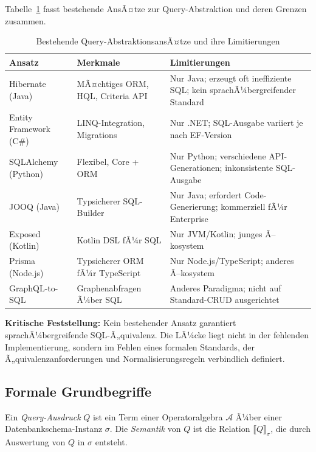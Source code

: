 Tabelle~\ref{tab:bestehend} fasst bestehende AnsÃ¤tze zur Query-Abstraktion
und deren Grenzen zusammen.

\begin{table}[H]
\centering
\caption{Bestehende Query-AbstraktionsansÃ¤tze und ihre Limitierungen}
\label{tab:bestehend}
\renewcommand{\arraystretch}{1.3}
\begin{tabularx}{\textwidth}{lXX}
\toprule
\textbf{Ansatz} & \textbf{Merkmale} & \textbf{Limitierungen} \\
\midrule
Hibernate (Java)
  & MÃ¤chtiges ORM, HQL, Criteria API
  & Nur Java; erzeugt oft ineffiziente SQL; kein sprachÃ¼bergreifender Standard \\
\hline
Entity Framework (C\#)
  & LINQ-Integration, Migrations
  & Nur .NET; SQL-Ausgabe variiert je nach EF-Version \\
\hline
SQLAlchemy (Python)
  & Flexibel, Core + ORM
  & Nur Python; verschiedene API-Generationen; inkonsistente SQL-Ausgabe \\
\hline
JOOQ (Java)
  & Typsicherer SQL-Builder
  & Nur Java; erfordert Code-Generierung; kommerziell fÃ¼r Enterprise \\
\hline
Exposed (Kotlin)
  & Kotlin DSL fÃ¼r SQL
  & Nur JVM/Kotlin; junges Ã–kosystem \\
\hline
Prisma (Node.js)
  & Typsicherer ORM fÃ¼r TypeScript
  & Nur Node.js/TypeScript; anderes Ã–kosystem \\
\hline
GraphQL-to-SQL
  & Graphenabfragen Ã¼ber SQL
  & Anderes Paradigma; nicht auf Standard-CRUD ausgerichtet \\
\bottomrule
\end{tabularx}
\end{table}

\begin{warningbox}
\textbf{Kritische Feststellung:}
Kein bestehender Ansatz garantiert sprachÃ¼bergreifende SQL-Ã„quivalenz.
Die LÃ¼cke liegt nicht in der fehlenden Implementierung, sondern im Fehlen
eines formalen Standards, der Ã„quivalenzanforderungen und
Normalisierungsregeln verbindlich definiert.
\end{warningbox}

\subsection{Formale Grundbegriffe}
\label{subsec:formale_grundbegriffe}

\begin{definition}
\label{def:query_expr}
Ein \emph{Query-Ausdruck} $Q$ ist ein Term einer Operatoralgebra $\mathcal{A}$
Ã¼ber einer Datenbankschema-Instanz $\sigma$. Die \emph{Semantik} von $Q$ ist
die Relation $\llbracket Q \rrbracket_\sigma$, die durch Auswertung von $Q$
in $\sigma$ entsteht.
\end{definition}

